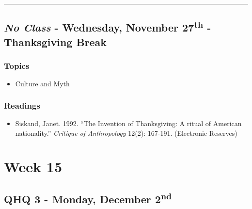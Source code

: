 \documentclass[]{book}
\providecommand{\tightlist}{%
  \setlength{\itemsep}{0pt}\setlength{\parskip}{0pt}}
\begin{document}
\begin{center}\rule{0.5\linewidth}{\linethickness}\end{center}

\hypertarget{no-class---wednesday-november-27th---thanksgiving-break}{%
\subsection*{\texorpdfstring{\emph{No Class} - Wednesday, November 27\textsuperscript{th} - Thanksgiving Break}{No Class - Wednesday, November 27th - Thanksgiving Break}}\label{no-class---wednesday-november-27th---thanksgiving-break}}

\hypertarget{topics-27}{%
\subsubsection*{Topics}\label{topics-27}}

\begin{itemize}
\tightlist
\item
  Culture and Myth
\end{itemize}

\hypertarget{readings-25}{%
\subsubsection*{Readings}\label{readings-25}}

\begin{itemize}
\tightlist
\item
  Siskand, Janet. 1992. ``The Invention of Thanksgiving: A ritual of American nationality.'' \emph{Critique of Anthropology} 12(2): 167-191. (Electronic Reserves)
\end{itemize}

\newpage

\hypertarget{week-15}{%
\section*{Week 15}\label{week-15}}

\hypertarget{qhq-3---monday-december-2nd}{%
\subsection*{\texorpdfstring{QHQ 3 - Monday, December 2\textsuperscript{nd}}{QHQ 3 - Monday, December 2nd}}\label{qhq-3---monday-december-2nd}}
\end{document}

